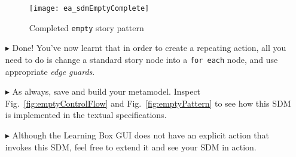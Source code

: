 \begin{itemize}
\begin{figure}[htbp]
\begin{center}
  \texttt{[image: ea\_sdmEmptyComplete]}
  \caption{Completed \texttt{empty} story pattern}  
  \label{fig:sdm_end}
\end{center}
\end{figure}
\FloatBarrier

\item[$\blacktriangleright$] Done! You've now learnt that in order to create a repeating action, all you need to do is change a standard story node
into a \texttt{for each} node, and use appropriate \emph{edge guards}. 

\item[$\blacktriangleright$] As always, save and build your metamodel. Inspect Fig.~\ref{fig:emptyControlFlow} and Fig.~\ref{fig:emptyPattern} to see how this
SDM is implemented in the textual specifications.

\item[$\blacktriangleright$] Although the Learning Box GUI does not have an explicit action that invokes this SDM, feel free to extend it and see your SDM in
action.


\end{itemize}

